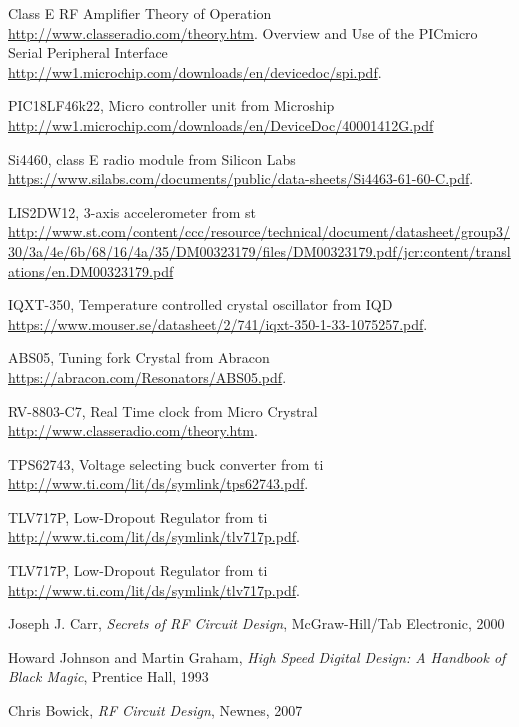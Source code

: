\begin{thebibliography}{99}
\label{sec:ref}





	Class E RF Amplifier Theory of Operation
	\url{http://www.classeradio.com/theory.htm}.
	Overview and Use of the PICmicro Serial Peripheral Interface
	\url{http://ww1.microchip.com/downloads/en/devicedoc/spi.pdf}.



	PIC18LF46k22, Micro controller unit from Microship
	\url{http://ww1.microchip.com/downloads/en/DeviceDoc/40001412G.pdf}

	Si4460, class E radio module from Silicon Labs
	\url{https://www.silabs.com/documents/public/data-sheets/Si4463-61-60-C.pdf}.

	LIS2DW12, 3-axis accelerometer from \gls{st}
	\url{http://www.st.com/content/ccc/resource/technical/document/datasheet/group3/30/3a/4e/6b/68/16/4a/35/DM00323179/files/DM00323179.pdf/jcr:content/translations/en.DM00323179.pdf}

	IQXT-350, Temperature controlled crystal oscillator from IQD
	\url{https://www.mouser.se/datasheet/2/741/iqxt-350-1-33-1075257.pdf}.

	ABS05, Tuning fork Crystal from Abracon
	\url{https://abracon.com/Resonators/ABS05.pdf}.

	RV-8803-C7, Real Time clock from Micro Crystral
	\url{http://www.classeradio.com/theory.htm}.

	TPS62743, Voltage selecting buck converter from \gls{ti}
	\url{http://www.ti.com/lit/ds/symlink/tps62743.pdf}.

	TLV717P, Low-Dropout Regulator from \gls{ti}
	\url{http://www.ti.com/lit/ds/symlink/tlv717p.pdf}.

	TLV717P, Low-Dropout Regulator from \gls{ti}
	\url{http://www.ti.com/lit/ds/symlink/tlv717p.pdf}.


	Joseph J. Carr,  \emph{Secrets of RF Circuit Design}, McGraw-Hill/Tab Electronic, 2000

	Howard Johnson and Martin Graham,  \emph{High Speed Digital Design: A Handbook of Black Magic},  Prentice Hall, 1993

	Chris Bowick,  \emph{RF Circuit Design}, Newnes, 2007


\end{thebibliography}
